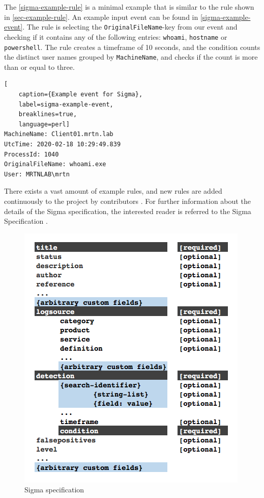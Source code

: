 The \cref{sigma-example-rule} is a minimal example that is similar to the rule shown in \cref{sec-example-rule}. An example input event can be found in \cref{sigma-example-event}. The rule is selecting the \lstinline{OriginalFileName}-key from our event and checking if it contains any of the following entries: \lstinline{whoami}, \lstinline{hostname} or  \lstinline{powershell}. The rule creates a timeframe of 10 seconds, and the condition counts the distinct user names grouped by \lstinline{MachineName}, and checks if the count is more than or equal to three.

\begin{lstlisting}[
    caption={Example event for Sigma},
    label=sigma-example-event,
    breaklines=true,
    language=perl]
MachineName: Client01.mrtn.lab
UtcTime: 2020-02-18 10:29:49.839
ProcessId: 1040
OriginalFileName: whoami.exe
User: MRTNLAB\mrtn
\end{lstlisting}

There exists a vast amount of example rules, and new rules are added continuously to the project by contributors \cite{sigmarules}. For further information about the details of the Sigma specification, the interested reader is referred to the Sigma Specification \cite{SigmaSpecification}.

\begin{figure}[htbp]  %
  \centering
  \includegraphics[scale=0.6]{figures/new-rule-format/Sigma_Schema.png}

  \caption[Sigma specification]{Sigma specification \cite{SigmaSpecification}}
  \label{fig:sigma-spec}
\end{figure}